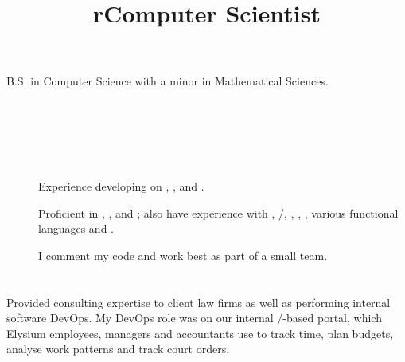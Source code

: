 \begin{resume}


\section{}

B.S. in Computer Science with a minor in Mathematical Sciences.


\begin{formatb}
  \title{r}\\
  \\
  \body\\
\end{formatb}


\section{}
\begin{description}
\item[]
Experience developing on , ,  and .
\item[]
Proficient in , ,  and \kw{\Cplusplus};
also have experience with , /,
, , , various functional languages and .
\item[]
I comment my code and work best as part of a small team.

\end{description}

\section{}

\title{Computer Scientist}
\begin{position}
Provided consulting expertise to client law firms as well as performing
internal software DevOps. My DevOps role was on our internal
/-based portal, which Elysium employees, managers and
accountants use to track
time, plan budgets, analyse work patterns and track court orders.


\end{position}
\end{resume}
